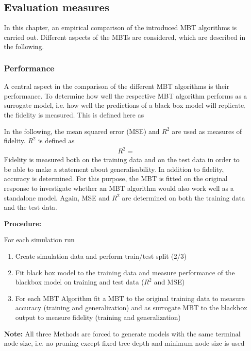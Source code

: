 \subsection{Evaluation measures}
In this chapter, an empirical comparison of the introduced MBT algorithms is carried out. Different aspects of the MBTs are considered, which are described in the following.

\subsubsection{Performance}
A central aspect in the comparison of the different MBT algorithms is their performance. 
To determine how well the respective MBT algorithm performs as a surrogate model, i.e. how well the predictions of a black box model will replicate, the fidelity is measured. This is defined here as

In the following, the mean squared error (MSE) and $R^2$ are used as measures of fidelity. $R^2$ is defined as
\begin{align}
    R^2 = 
\end{align}
Fidelity is measured both on the training data and on the test data in order to be able to make a statement about generalisability.
In addition to fidelity, accuracy is determined. For this purpose, the MBT is fitted on the original response to investigate whether an MBT algorithm would also work well as a standalone model. Again, MSE and $R^2$ are determined on both the training data and the test data.

\vspace{0.5cm}

\textbf{Procedure:} 

For each simulation run 
\begin{enumerate}
    \item Create simulation data and perform train/test split (2/3)
    \item Fit black box model to the training data and measure performance of the blackbox model on training and test data ($R^2$ and MSE)
    \item For each MBT Algorithm fit a MBT  to the original training data to measure accuracy (training and generalization) and as surrogate MBT to the blackbox output to measure fidelity (training and generalization)
\end{enumerate}

\textbf{Note:} All three Methods are forced to generate models with the same terminal node size, i.e. no pruning except fixed tree depth and minimum node size is used


